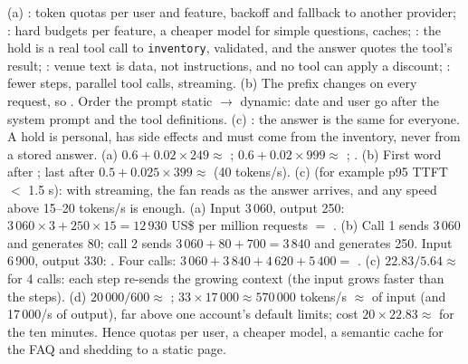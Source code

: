  (a) : token quotas per user and feature, backoff and fallback to another provider; : hard budgets per feature, a cheaper model for simple questions, caches; : the hold is a real tool call to \texttt{inventory}, validated, and the answer quotes the tool's result; : venue text is data, not instructions, and no tool can apply a discount; : fewer steps, parallel tool calls, streaming. (b) The prefix changes on every request, so . Order the prompt static $\to$ dynamic: date and user go after the system prompt and the tool definitions. (c) : the answer is the same for everyone. A hold is personal, has side effects and must come from the inventory, never from a stored answer.
 (a) $0.6 + 0.02 \times 249 \approx$ ; $0.6 + 0.02 \times 999 \approx$ ; . (b) First word after ; last after $0.5 + 0.025 \times 399 \approx$  (40 tokens/s). (c)  (for example p95 TTFT $<$ 1.5 s): with streaming, the fan reads as the answer arrives, and any speed above 15--20 tokens/s is enough.
 (a) Input 3\,060, output 250: $3\,060 \times 3 + 250 \times 15 = 12\,930$ US\$ per million requests $=$ . (b) Call 1 sends 3\,060 and generates 80; call 2 sends $3\,060 + 80 + 700 = 3\,840$ and generates 250. Input 6\,900, output 330: . Four calls: $3\,060 + 3\,840 + 4\,620 + 5\,400 =$ . (c) $22.83/5.64 \approx$  for 4 calls: each step re-sends the growing context (the input grows faster than the steps). (d) $20\,000/600 \approx$ ; $33 \times 17\,000 \approx 570\,000$ tokens/s $\approx$  of input (and 17\,000/s of output), far above one account's default limits; cost $20 \times 22.83 \approx$  for the ten minutes. Hence quotas per user, a cheaper model, a semantic cache for the FAQ and shedding to a static page.
